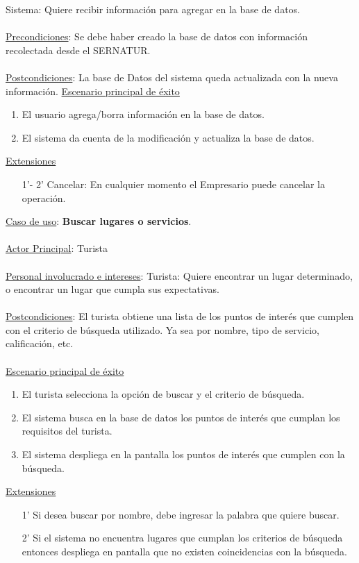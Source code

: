 \documentclass[12pt]{article}
\begin{document}
Sistema: Quiere recibir información para agregar en la base de datos.\\\\
\underline{Precondiciones}: Se debe haber creado la base de datos con información recolectada desde el SERNATUR.\\\\
\underline{Postcondiciones}: La base de Datos del sistema queda actualizada con la nueva información.
\underline{Escenario principal de éxito}
\begin{enumerate}
\item El usuario agrega/borra información en la base de datos.
\item El sistema da cuenta de la modificación y actualiza la base de datos.
\end{enumerate}
\underline{Extensiones}
\begin{enumerate}
\item[1'- 2'] Cancelar: En cualquier momento el Empresario puede cancelar la operación.
\end{enumerate}
\underline{Caso de uso}: \textbf{Buscar lugares o servicios}.\\\\
\underline{Actor Principal}: Turista\\\\
\underline{Personal involucrado e intereses}: Turista: Quiere encontrar un lugar determinado, o encontrar un lugar que cumpla sus expectativas.\\\\
\underline{Postcondiciones}: El turista obtiene una lista de los puntos de interés que cumplen con el criterio de búsqueda utilizado. Ya sea por nombre, tipo de servicio, calificación, etc.\\\\
\underline{Escenario principal de éxito}
\begin{enumerate}
\item El turista selecciona la opción de buscar y el criterio de búsqueda.
\item El sistema busca en la base de datos los puntos de interés que cumplan los requisitos del turista.
\item El sistema despliega en la pantalla los puntos de interés que cumplen con la búsqueda.
\end{enumerate}
\underline{Extensiones}
\begin{enumerate}
\item[1'] Si desea buscar por nombre, debe ingresar la palabra que quiere buscar.
\item[2'] Si el sistema no encuentra lugares que cumplan los criterios de búsqueda entonces despliega en pantalla que no existen coincidencias con la búsqueda.
\end{enumerate}
\end{document}
